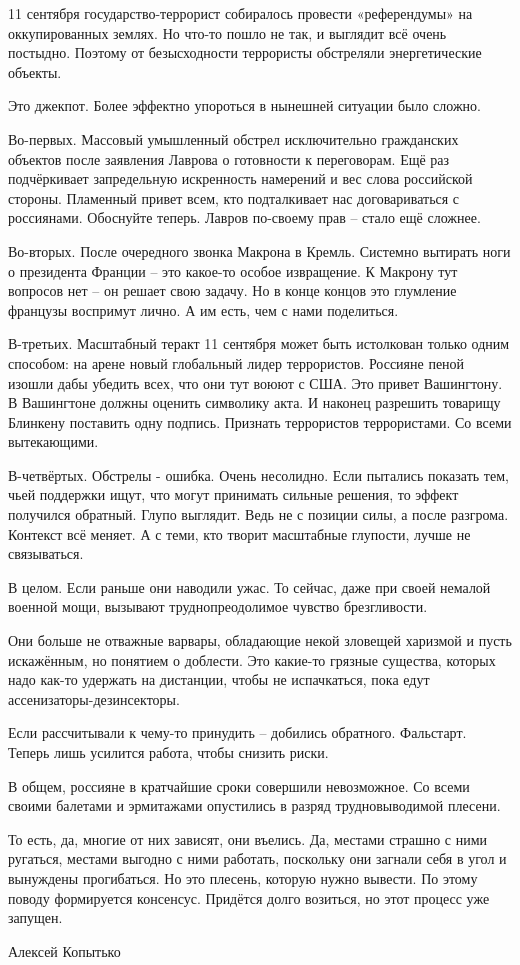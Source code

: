 11 сентября государство-террорист собиралось провести «референдумы» на оккупированных землях. Но что-то пошло не так, и выглядит всё очень постыдно. Поэтому от безысходности террористы обстреляли энергетические объекты. 
 
Это джекпот. Более эффектно упороться в нынешней ситуации было сложно.
 
Во-первых. Массовый умышленный обстрел исключительно гражданских объектов после заявления Лаврова о готовности к переговорам. Ещё раз подчёркивает запредельную искренность намерений и вес слова российской стороны. Пламенный привет всем, кто подталкивает нас договариваться с россиянами. Обоснуйте теперь. Лавров по-своему прав – стало ещё сложнее. 
 
Во-вторых. После очередного звонка Макрона в Кремль. Системно вытирать ноги о президента Франции – это какое-то особое извращение. К Макрону тут вопросов нет – он решает свою задачу. Но в конце концов это глумление французы воспримут лично. А им есть, чем с нами поделиться. 
 
В-третьих. Масштабный теракт 11 сентября может быть истолкован только одним способом: на арене новый глобальный лидер террористов. Россияне пеной изошли дабы убедить всех, что они тут воюют с США. Это привет Вашингтону. В Вашингтоне должны оценить символику акта. И наконец разрешить товарищу Блинкену поставить одну подпись. Признать террористов террористами. Со всеми вытекающими. 
 
В-четвёртых. Обстрелы - ошибка. Очень несолидно. Если пытались показать тем, чьей поддержки ищут, что могут принимать сильные решения, то эффект получился обратный. Глупо выглядит. Ведь не с позиции силы, а после разгрома. Контекст всё меняет. А с теми, кто творит масштабные глупости, лучше не связываться.

В целом. Если раньше они наводили ужас. То сейчас, даже при своей немалой военной мощи, вызывают труднопреодолимое чувство брезгливости. 
 
Они больше не отважные варвары, обладающие некой зловещей харизмой и пусть искажённым, но понятием о доблести. Это какие-то грязные существа, которых надо как-то удержать на дистанции, чтобы не испачкаться, пока едут ассенизаторы-дезинсекторы. 
 
Если рассчитывали к чему-то принудить – добились обратного. Фальстарт. Теперь лишь усилится работа, чтобы снизить риски.
 
В общем, россияне в кратчайшие сроки совершили невозможное. Со всеми своими балетами и эрмитажами опустились в разряд трудновыводимой плесени. 
 
То есть, да, многие от них зависят, они въелись. Да, местами страшно с ними ругаться, местами выгодно с ними работать, поскольку они загнали себя в угол и вынуждены прогибаться. Но это плесень, которую нужно вывести. По этому поводу формируется консенсус. Придётся долго возиться, но этот процесс уже запущен.

 Алексей Копытько
